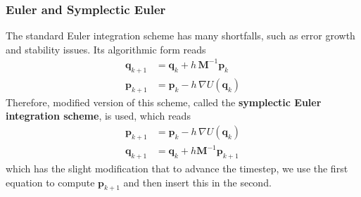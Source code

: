 \documentclass{article}
\theoremstyle{remark}
\theoremstyle{definition}
\begin{document}
\subsubsection{Euler and Symplectic Euler}
The standard Euler integration scheme has many shortfalls, such as error growth and stability issues. Its algorithmic form reads 
\begin{align*}
    \mathbf{q}_{k + 1} & = \mathbf{q}_k + h \, \mathbf{M}^{-1} \mathbf{p}_k \\
    \mathbf{p}_{k + 1} & = \mathbf{p}_k - h \, \nabla U(\mathbf{q}_k)
\end{align*}
Therefore, modified version of this scheme, called the \textbf{symplectic Euler integration scheme}, is used, which reads 
\begin{align*}
    \mathbf{p}_{k+1} & = \mathbf{p}_k - h \, \nabla U(\mathbf{q}_k) \\
    \mathbf{q}_{k+1} & = \mathbf{q}_k + h \mathbf{M}^{-1} \mathbf{p}_{k+1} 
\end{align*}
which has the slight modification that to advance the timestep, we use the first equation to compute $\mathbf{p}_{k+1}$ and then insert this in the second. 
\end{document}
